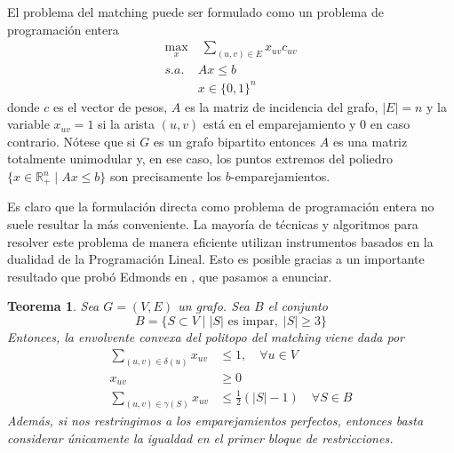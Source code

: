 \documentclass[twoside,a4paper,openright,12pt,tikz]{book}
\newtheorem{thm}{Teorema}[section]
\newcommand{\R}{\mathbb{R}}
\begin{document}
El problema del matching puede ser formulado como un problema de programación entera
\begin{align*}
\max_{x} &\; \sum_{(u,v)\in E} x_{uv}c_{uv}  \nonumber\\ 
s.a.\;  &  Ax\leq b \\
& x\in\{0,1\}^n\nonumber
\end{align*}
donde $c$ es el vector de pesos, $A$ es la matriz de incidencia del grafo, $|E|=n$ y la variable $x_{uv}=1$ si la arista $(u,v)$ está en el emparejamiento y $0$ en caso contrario. Nótese que si $G$ es un grafo bipartito entonces $A$ es una matriz totalmente unimodular y, en ese caso, los puntos extremos del poliedro $\{x \in \R^n_+\mid Ax\leq b\}$ son precisamente los $b$-emparejamientos.

Es claro que la formulación directa como problema de programación entera no suele resultar la más conveniente. La mayoría de técnicas y algoritmos para resolver este problema de manera eficiente utilizan instrumentos basados en la dualidad de la Programación Lineal. Esto es posible gracias a un importante resultado que probó Edmonds en \cite{edmond}, que pasamos a enunciar.
\begin{thm}
Sea $G=(V,E)$ un grafo. Sea $B$ el conjunto
$$
B = \{S\subset V \mid |S| \text{ es impar},\;|S|\geq 3\}
$$
Entonces, la envolvente convexa del politopo del matching viene dada por
\begin{align*}
\sum_{(u,v)\in\delta(u)} x_{uv} &\leq 1, \quad \forall u\in V\\
x_{uv} &\geq 0\\
\sum_{(u,v)\in \gamma(S)} x_{uv}& \leq \frac{1}{2}(|S|-1)\quad \forall S \in B	
\end{align*}
Además, si nos restringimos a los emparejamientos perfectos, entonces basta considerar únicamente la igualdad en el primer bloque de restricciones.
\end{thm}
\end{document}
